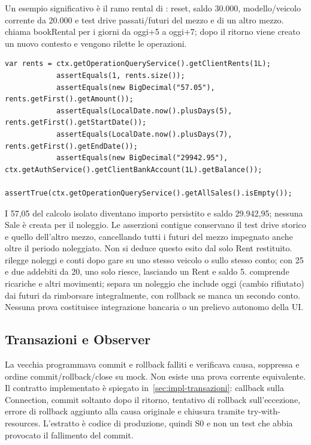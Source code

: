 Un esempio significativo è il ramo rental di
:
reset, saldo 30.000, modello/veicolo corrente da 20.000 e test drive
passati/futuri del mezzo e di un altro mezzo.  chiama
bookRental per i giorni da oggi+5 a oggi+7; dopo il ritorno viene creato
un nuovo contesto e vengono rilette le operazioni.

\noindent\begin{minipage}{\linewidth}
\begin{lstlisting}[firstnumber=103,caption={Rilettura del Rent, delle date incluse e del saldo dopo il noleggio.},label=lst:test-rental]
            var rents = ctx.getOperationQueryService().getClientRents(1L);
            assertEquals(1, rents.size());
            assertEquals(new BigDecimal("57.05"), rents.getFirst().getAmount());
            assertEquals(LocalDate.now().plusDays(5), rents.getFirst().getStartDate());
            assertEquals(LocalDate.now().plusDays(7), rents.getFirst().getEndDate());
            assertEquals(new BigDecimal("29942.95"), ctx.getAuthService().getClientBankAccount(1L).getBalance());
            assertTrue(ctx.getOperationQueryService().getAllSales().isEmpty());
\end{lstlisting}
\end{minipage}


I 57,05 del calcolo isolato diventano importo persistito e saldo 29.942,95;
nessuna Sale è creata per il noleggio. Le asserzioni contigue conservano
il test drive storico e quello dell'altro mezzo, cancellando tutti i futuri
del mezzo impegnato anche oltre il periodo noleggiato. Non si deduce questo
esito dal solo Rent restituito.
 rilegge noleggi e conti dopo gare
su uno stesso veicolo o sullo stesso conto; con 25 e due addebiti da 20,
uno solo riesce, lasciando un Rent e saldo 5. 
comprende ricariche e altri movimenti; 
separa un noleggio che include oggi (cambio rifiutato) dai futuri da rimborsare
integralmente, con rollback se manca un secondo conto. Nessuna prova
costituisce integrazione bancaria o un prelievo autonomo della UI.

\subsection{Transazioni e Observer}\label{sec:test-transazioni}
La vecchia  programmava commit e rollback
falliti e verificava causa, soppressa e ordine commit/rollback/close su mock.
Non esiste una prova corrente equivalente. Il contratto implementato è
spiegato in~\ref{sec:impl-transazioni}: callback sulla Connection,
commit soltanto dopo il ritorno, tentativo di rollback sull'eccezione,
errore di rollback aggiunto alla causa originale e chiusura tramite
try-with-resources. L'estratto è codice di produzione, quindi S0 e non
un test che abbia provocato il fallimento del commit.

